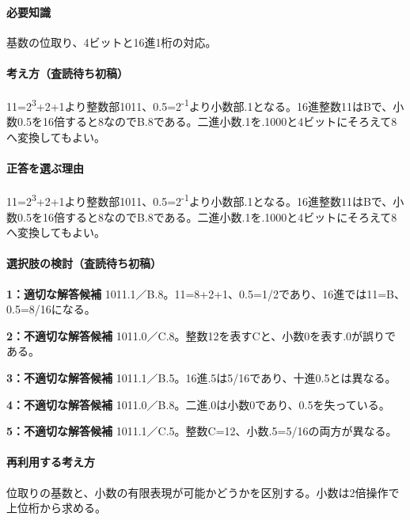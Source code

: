 \paragraph{必要知識} 基数の位取り、4ビットと16進1桁の対応。

\paragraph{考え方（査読待ち初稿）} 11=\allowbreak{}2\textsuperscript{3}+2+1より整数部1011、0.5=\allowbreak{}2\textsuperscript{-1}より小数部.1となる。16進整数11はBで、小数0.5を16倍すると8なのでB.8である。二進小数.1を.1000と4ビットにそろえて8へ変換してもよい。

\paragraph{正答を選ぶ理由} 11=\allowbreak{}2\textsuperscript{3}+2+1より整数部1011、0.5=\allowbreak{}2\textsuperscript{-1}より小数部.1となる。16進整数11はBで、小数0.5を16倍すると8なのでB.8である。二進小数.1を.1000と4ビットにそろえて8へ変換してもよい。

\paragraph{選択肢の検討（査読待ち初稿）}\mbox{}\par

\noindent\textbf{1：適切な解答候補} 1011.1／B.8。11=\allowbreak{}8+2+1、0.5=\allowbreak{}1/2であり、16進では11=\allowbreak{}B、0.5=\allowbreak{}8/16になる。\par

\noindent\textbf{2：不適切な解答候補} 1011.0／C.8。整数12を表すCと、小数0を表す.0が誤りである。\par

\noindent\textbf{3：不適切な解答候補} 1011.1／B.5。16進.5は5/16であり、十進0.5とは異なる。\par

\noindent\textbf{4：不適切な解答候補} 1011.0／B.8。二進.0は小数0であり、0.5を失っている。\par

\noindent\textbf{5：不適切な解答候補} 1011.1／C.5。整数C=\allowbreak{}12、小数.5=\allowbreak{}5/16の両方が異なる。\par

\paragraph{再利用する考え方} 位取りの基数と、小数の有限表現が可能かどうかを区別する。小数は2倍操作で上位桁から求める。

